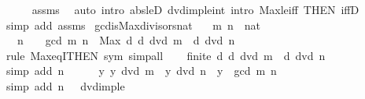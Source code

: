\begin{isabellebody}
\ \ \ \ \isamarkupfalse%
\ assms\ \isamarkupfalse%
\ {\isacharparenleft}{\kern0pt}auto\ intro{\isacharcolon}{\kern0pt}\ abs{\isacharunderscore}{\kern0pt}le{\isacharunderscore}{\kern0pt}D{}\ dvd{\isacharunderscore}{\kern0pt}imp{\isacharunderscore}{\kern0pt}le{\isacharunderscore}{\kern0pt}int\ intro{\isacharbang}{\kern0pt}{\isacharcolon}{\kern0pt}\ Max{\isacharunderscore}{\kern0pt}le{\isacharunderscore}{\kern0pt}iff\ {\isacharbrackleft}{\kern0pt}THEN\ iffD{}{\isacharbrackright}{\kern0pt}{\isacharparenright}{\kern0pt}\isanewline
{}\isamarkupfalse%
\ {\isacharparenleft}{\kern0pt}simp\ add{\isacharcolon}{\kern0pt}\ assms{\isacharparenright}{\kern0pt}%
\endisatagproof
{\isafoldproof}%
%
\isadelimproof
\isanewline
%
\endisadelimproof
\isanewline
{}\isamarkupfalse%
\ gcd{\isacharunderscore}{\kern0pt}is{\isacharunderscore}{\kern0pt}Max{\isacharunderscore}{\kern0pt}divisors{\isacharunderscore}{\kern0pt}nat{\isacharcolon}{\kern0pt}\isanewline
\ \ \ m\ n\ {\isacharcolon}{\kern0pt}{\isacharcolon}{\kern0pt}\ nat\isanewline
\ \ \ {\isachardoublequoteopen}n\ {\isachargreater}{\kern0pt}\ {}{\isachardoublequoteclose}\ \ {\isachardoublequoteopen}gcd\ m\ n\ {\isacharequal}{\kern0pt}\ Max\ {\isacharbraceleft}{\kern0pt}d{\isachardot}{\kern0pt}\ d\ dvd\ m\ {\isasymand}\ d\ dvd\ n{\isacharbraceright}{\kern0pt}{\isachardoublequoteclose}\isanewline
%
\isadelimproof
%
\endisadelimproof
%
\isatagproof
{}\isamarkupfalse%
\ {\isacharparenleft}{\kern0pt}rule\ Max{\isacharunderscore}{\kern0pt}eqI{\isacharbrackleft}{\kern0pt}THEN\ sym{\isacharbrackright}{\kern0pt}{\isacharcomma}{\kern0pt}\ simp{\isacharunderscore}{\kern0pt}all{\isacharparenright}{\kern0pt}\isanewline
\ \ \isamarkupfalse%
\ {\isachardoublequoteopen}finite\ {\isacharbraceleft}{\kern0pt}d{\isachardot}{\kern0pt}\ d\ dvd\ m\ {\isasymand}\ d\ dvd\ n{\isacharbraceright}{\kern0pt}{\isachardoublequoteclose}\isanewline
\ \ \ \ \isamarkupfalse%
\ {\isacharparenleft}{\kern0pt}simp\ add{\isacharcolon}{\kern0pt}\ {\isacartoucheopen}n\ {\isachargreater}{\kern0pt}\ {}{\isacartoucheclose}{\isacharparenright}{\kern0pt}\isanewline
\ \ \isamarkupfalse%
\ {\isachardoublequoteopen}{\isasymAnd}y{\isachardot}{\kern0pt}\ y\ dvd\ m\ {\isasymand}\ y\ dvd\ n\ {\isasymLongrightarrow}\ y\ {\isasymle}\ gcd\ m\ n{\isachardoublequoteclose}\isanewline
\ \ \ \ \isamarkupfalse%
\ {\isacharparenleft}{\kern0pt}simp\ add{\isacharcolon}{\kern0pt}\ {\isacartoucheopen}n\ {\isachargreater}{\kern0pt}\ {}{\isacartoucheclose}\ dvd{\isacharunderscore}{\kern0pt}imp{\isacharunderscore}{\kern0pt}le{\isacharparenright}{\kern0pt}\isanewline

\end{isabellebody}
